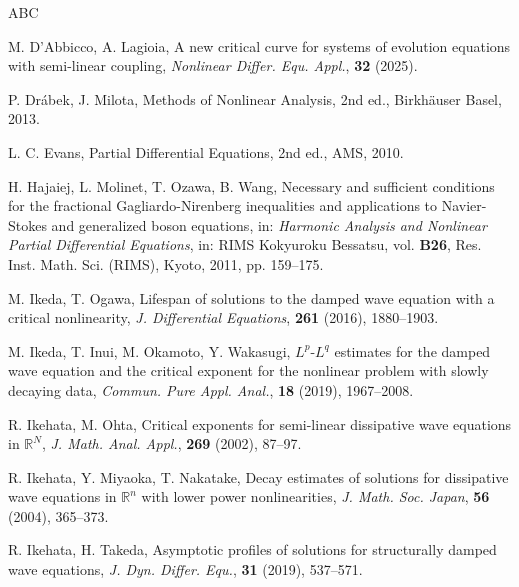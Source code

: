 \documentclass[11pt,reqno]{amsart}
\begin{document}
	
	\begin{thebibliography}{ABC}
		
		 M. D'Abbicco, A. Lagioia, A new critical curve for systems of evolution equations with semi-linear coupling, \textit{Nonlinear Differ. Equ. Appl.}, \textbf{32} (2025).
		
		 P. Dr\'{a}bek, J. Milota, Methods of Nonlinear Analysis, 2nd ed., Birkh\"{a}user Basel, 2013.
		
		 L. C. Evans, Partial Differential Equations, 2nd ed., AMS, 2010.
		
		 H. Hajaiej, L. Molinet, T. Ozawa, B. Wang, Necessary and sufficient conditions for the fractional Gagliardo-Nirenberg inequalities and applications to Navier-Stokes and generalized boson equations, in: {\it Harmonic Analysis and Nonlinear Partial Differential Equations}, in: RIMS Kokyuroku Bessatsu, vol. {\bf B26}, Res. Inst. Math. Sci. (RIMS), Kyoto, 2011, pp. 159–175.
		
		 M. Ikeda, T. Ogawa, Lifespan of solutions to the damped wave equation with a critical nonlinearity, \textit{J. Differential Equations}, \textbf{261} (2016), 1880--1903.
		
		 M. Ikeda, T. Inui, M. Okamoto, Y. Wakasugi, $L^p$-$L^q$ estimates for the damped wave equation and the critical exponent for the nonlinear problem with slowly decaying data, \textit{Commun. Pure Appl. Anal.}, \textbf{18} (2019), 1967--2008.
		
		 R. Ikehata, M. Ohta, Critical exponents for semi-linear dissipative wave equations in $\mathbb{R}^N$, \textit{J. Math. Anal. Appl.}, \textbf{269} (2002), 87--97.
		
		 R. Ikehata, Y. Miyaoka, T. Nakatake, Decay estimates of solutions for dissipative wave equations in $\mathbb{R}^n$ with lower power nonlinearities, \textit{J. Math. Soc. Japan}, \textbf{56} (2004), 365--373. 
		
		 R. Ikehata, H. Takeda, Asymptotic profiles of solutions for structurally damped wave equations, \textit{J. Dyn. Differ. Equ.}, \textbf{31} (2019), 537--571.
		

\end{thebibliography}
\end{document}
